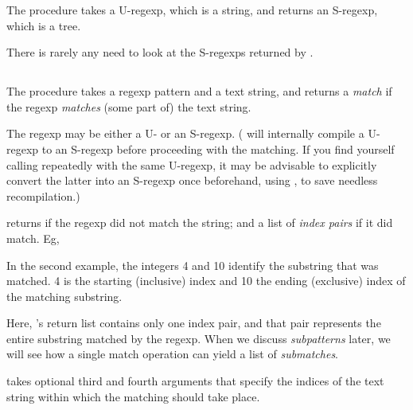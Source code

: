 {The procedure  takes
a U-regexp, which is a string, and returns
an S-regexp, which is a tree.


\n There is rarely any need to look at the S-regexps
returned by .

\subsection{}

The procedure  takes
a
regexp pattern and a text string, and returns a {\em
match} if the regexp {\em matches} (some part of) the text string.

The regexp may be either a U- or an S-regexp.
( will internally compile a
U-regexp to an S-regexp before proceeding with the
matching.  If you find yourself calling
 repeatedly with the same
U-regexp, it may be advisable to explicitly convert the
latter into an S-regexp once beforehand, using
, to save needless recompilation.)

 returns  if the regexp did not
match the string; and a list of {\em index pairs} if it
did match.  Eg,


\n In the second example, the integers 4 and 10 identify
the substring that was matched. 4 is the starting
(inclusive) index and 10 the ending (exclusive) index of
the matching substring.


Here, 's return list contains only
one index pair, and that pair represents the entire
substring matched by the regexp.  When we discuss
{\em subpatterns} later, we will see how a single match
operation can yield a list of {\em submatches}.

 takes optional third
and fourth arguments that specify the indices of
the text string within which the matching should
take place.


}
